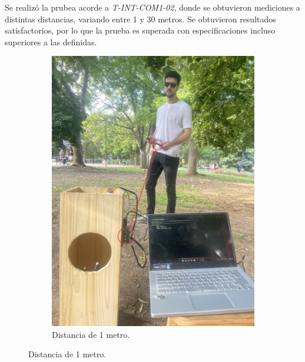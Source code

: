 Se realizó la prubea acorde a  \textit{T-INT-COM1-02}, donde se obtuvieron mediciones a distintas distancias, variando entre 1 y 30 metros. Se obtuvieron resultados satisfactorios, por lo que la prueba es superada con especificaciones incluso superiores a las definidas.
\begin{figure}[H]
\centering
	\begin{subfigure}{0.3\textwidth}
		\centering
		\includegraphics[width=\linewidth]{ImagenesValidacion del prototipo/TINTCOM12a}
		\caption{Distancia de 1 metro.}
	\end{subfigure}	
\end{figure}
